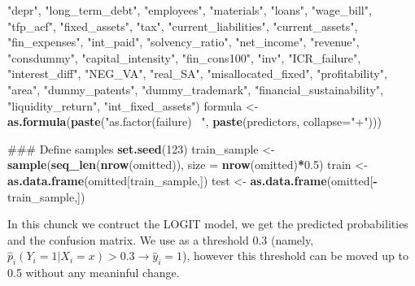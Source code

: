 \documentclass[]{article}
\newenvironment{Shaded}{\begin{snugshade}}{\end{snugshade}}
\newcommand{\DataTypeTok}[1]{\textcolor[rgb]{0.13,0.29,0.53}{#1}}
\newcommand{\DecValTok}[1]{\textcolor[rgb]{0.00,0.00,0.81}{#1}}
\newcommand{\FloatTok}[1]{\textcolor[rgb]{0.00,0.00,0.81}{#1}}
\newcommand{\KeywordTok}[1]{\textcolor[rgb]{0.13,0.29,0.53}{\textbf{#1}}}
\newcommand{\NormalTok}[1]{#1}
\newcommand{\OperatorTok}[1]{\textcolor[rgb]{0.81,0.36,0.00}{\textbf{#1}}}
\newcommand{\StringTok}[1]{\textcolor[rgb]{0.31,0.60,0.02}{#1}}
\begin{document}
\begin{Shaded}
\begin{Highlighting}[]
                \StringTok{"depr"}\NormalTok{, }\StringTok{"long_term_debt"}\NormalTok{, }\StringTok{"employees"}\NormalTok{,}
                \StringTok{"materials"}\NormalTok{, }\StringTok{"loans"}\NormalTok{, }\StringTok{"wage_bill"}\NormalTok{, }\StringTok{"tfp_acf"}\NormalTok{,}
                \StringTok{"fixed_assets"}\NormalTok{, }\StringTok{"tax"}\NormalTok{, }\StringTok{"current_liabilities"}\NormalTok{,}
                \StringTok{"current_assets"}\NormalTok{, }\StringTok{"fin_expenses"}\NormalTok{, }\StringTok{"int_paid"}\NormalTok{,}
                \StringTok{"solvency_ratio"}\NormalTok{, }\StringTok{"net_income"}\NormalTok{, }\StringTok{"revenue"}\NormalTok{,}
                \StringTok{"consdummy"}\NormalTok{, }\StringTok{"capital_intensity"}\NormalTok{, }\StringTok{"fin_cons100"}\NormalTok{,}
                \StringTok{"inv"}\NormalTok{, }\StringTok{"ICR_failure"}\NormalTok{, }\StringTok{"interest_diff"}\NormalTok{, }\StringTok{"NEG_VA"}\NormalTok{,}
                \StringTok{"real_SA"}\NormalTok{, }\StringTok{"misallocated_fixed"}\NormalTok{, }\StringTok{"profitability"}\NormalTok{,}
                \StringTok{"area"}\NormalTok{, }\StringTok{"dummy_patents"}\NormalTok{, }\StringTok{"dummy_trademark"}\NormalTok{,}
                \StringTok{"financial_sustainability"}\NormalTok{, }\StringTok{"liquidity_return"}\NormalTok{,}
                \StringTok{"int_fixed_assets"}\NormalTok{)}
\NormalTok{formula <-}\StringTok{ }\KeywordTok{as.formula}\NormalTok{(}\KeywordTok{paste}\NormalTok{(}\StringTok{"as.factor(failure) ~"}\NormalTok{,}
                            \KeywordTok{paste}\NormalTok{(predictors, }\DataTypeTok{collapse=}\StringTok{"+"}\NormalTok{)))}

\NormalTok{### Define samples}
\KeywordTok{set.seed}\NormalTok{(}\DecValTok{123}\NormalTok{)}
\NormalTok{train_sample <-}\StringTok{ }\KeywordTok{sample}\NormalTok{(}\KeywordTok{seq_len}\NormalTok{(}\KeywordTok{nrow}\NormalTok{(omitted)), }\DataTypeTok{size =} \KeywordTok{nrow}\NormalTok{(omitted)}\OperatorTok{*}\FloatTok{0.5}\NormalTok{) }
\NormalTok{train <-}\StringTok{ }\KeywordTok{as.data.frame}\NormalTok{(omitted[train_sample,])}
\NormalTok{test <-}\StringTok{ }\KeywordTok{as.data.frame}\NormalTok{(omitted[}\OperatorTok{-}\NormalTok{train_sample,])}
\end{Highlighting}
\end{Shaded}

In this chunck we contruct the LOGIT model, we get the predicted
probabilities and the confusion matrix. We use as a threshold 0.3
(namely, \(\hat{p}_i(Y_i = 1 | X_i = x)>0.3 \rightarrow \hat{y}_i=1\)),
however this threshold can be moved up to 0.5 without any meaninful
change.
\end{document}
